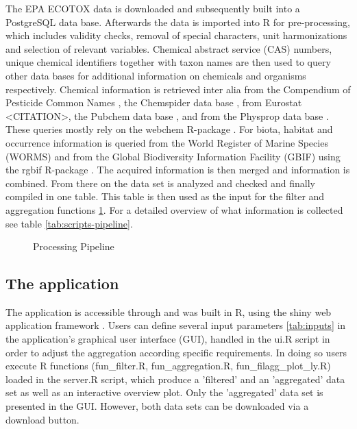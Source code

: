 The EPA ECOTOX data is downloaded and subsequently built into a PostgreSQL data base. Afterwards the data is imported into R for pre-processing, which includes validity checks, removal of special characters, unit harmonizations and selection of relevant variables. Chemical abstract service (CAS) numbers, unique chemical identifiers together with taxon names are then used to query other data bases for additional information on chemicals and organisms respectively. Chemical information is retrieved inter alia from the Compendium of Pesticide Common Names \citep{CITE_AW}, the Chemspider data base \citep{CITE-CHEMSPIDER}, from Eurostat <CITATION>, the Pubchem data base \citep{CITE_PUBCHEM}, and from the Physprop data base \citep{CITE_PHYSPROP}. These queries mostly rely on the webchem R-package \citep{szocs_webchem_2015-1}. For biota, habitat and occurrence information is queried from the World Register of Marine Species (WORMS) \citep{WORMS} and from the Global Biodiversity Information Facility (GBIF) \citep{CITE_RGBIF} using the rgbif R-package \citep{chamberlain_rgbif_2018}. The acquired information is then merged and information is combined. From there on the data set is analyzed and checked and finally compiled in one table. This table is then used as the input for the filter and aggregation functions \ref{fig:pipeline}. For a detailed overview of what information is collected see table \ref{tab:scripts-pipeline}.

\begin{figure}
    
    \caption{Processing Pipeline}
    \label{fig:pipeline}
\end{figure}


\subsection*{The application}
The application is accessible through \app{} and was built in R, using the shiny web application framework \citep{chang_shiny_2018}. Users can define several input parameters \ref{tab:inputs} in the application's graphical user interface (GUI), handled in the ui.R script in order to adjust the aggregation according specific requirements. In doing so users execute R functions (fun\_filter.R, fun\_aggregation.R, fun\_filagg\_plot\_ly.R) loaded in the server.R script, which produce a 'filtered' and an 'aggregated' data set as well as an interactive overview plot. Only the 'aggregated' data set is presented in the GUI. However, both data sets can be downloaded via a download button.


